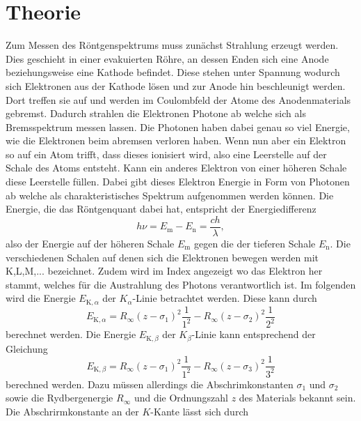 \section{Theorie}
\label{sec:Theorie}

Zum Messen des Röntgenspektrums muss zunächst Strahlung erzeugt werden.
Dies geschieht in einer evakuierten Röhre, an dessen Enden sich eine Anode beziehungsweise eine Kathode befindet.
Diese stehen unter Spannung wodurch sich Elektronen aus der Kathode lösen und zur Anode hin beschleunigt werden.
Dort treffen sie auf und werden im Coulombfeld der Atome des Anodenmaterials gebremst.
Dadurch strahlen die Elektronen Photone ab welche sich als Bremsspektrum messen lassen.
Die Photonen haben dabei genau so viel Energie, wie die Elektronen beim abremsen verloren haben.
Wenn nun aber ein Elektron so auf ein Atom trifft, dass dieses ionisiert wird, also eine Leerstelle auf der Schale des Atoms entsteht.
Kann ein anderes Elektron von einer höheren Schale diese Leerstelle füllen.
Dabei gibt dieses Elektron Energie in Form von Photonen ab welche als charakteristisches Spektrum aufgenommen werden können.
Die Energie, die das Röntgenquant dabei hat, entspricht der Energiedifferenz 
\begin{equation}
    h \nu = E_ \text{m} - E_ \text{n} = \frac{ch}{\lambda},
    \label{eq:eng}
\end{equation}
also der Energie auf der höheren Schale $E_ \text{m}$ gegen die der tieferen Schale $E_\text{n}$.
Die verschiedenen Schalen auf denen sich die Elektronen bewegen werden mit K,L,M,... bezeichnet.
Zudem wird im Index angezeigt wo das Elektron her stammt, welches für die Austrahlung des Photons verantwortlich ist.
Im folgenden wird die Energie $E_{ \text{K},\alpha}$ der $K_\alpha$-Linie betrachtet werden.
Diese kann durch 
\begin{equation}
    E_{\text{K},\alpha} = R_ \infty (z - \sigma_1)^2 \frac{1}{1^2} - R_ \infty (z-\sigma_2)^2 \frac{1}{2^2}
    \label{eq:enkkante}
\end{equation}
berechnet werden.
Die Energie $E_{ \text{K},\beta}$ der $K_\beta$-Linie kann entsprechend der Gleichung
\begin{equation}
    E_{\text{K}, \beta} = R_ \infty (z - \sigma_1)^2 \frac{1}{1^2} - R_ \infty (z-\sigma_3)^2 \frac{1}{3^2}
\end{equation}
berechned werden.
Dazu müssen allerdings die Abschrimkonstanten $\sigma_1 $ und $\sigma_2$ sowie die Rydbergenergie $R_\infty$ und die Ordnungszahl $z$ des Materials bekannt sein.
Die Abschrirmkonstante an der $K$-Kante lässt sich durch 
